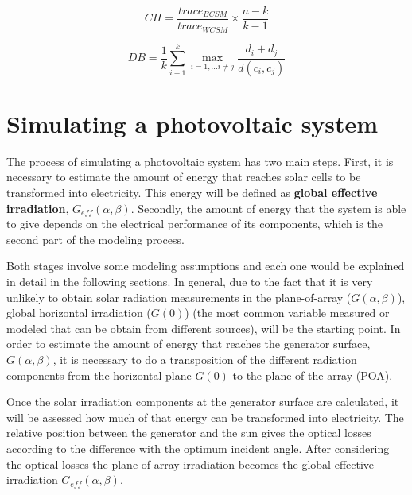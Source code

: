 \begin{equation}\label{eq:calinski}
    CH =\frac{trace_{BCSM}}{trace_{WCSM}}\times\frac{n-k}{k-1}
\end{equation}

\begin{equation}\label{eq:davies}
    DB =\frac{1}{k}\sum_{i-1}^{k}\max_{i=1,...i\neq{j}}{\frac{d_{i}+d_{j}}{d(c_i,c_j)}}
\end{equation}

\section{Simulating a photovoltaic system}

The process of simulating a photovoltaic system has two main steps. First, it is necessary to estimate the amount of energy that reaches solar cells to be transformed into electricity. This energy will be defined as \textbf{global effective irradiation}, $G_{eff}(\alpha, \beta)$. Secondly, the amount of energy that the system is able to give depends on the electrical performance of its components, which is the second part of the modeling process.

Both stages involve some modeling assumptions and each one would be explained in detail in the following sections. In general, due to the fact that it is very unlikely to obtain solar radiation measurements in the plane-of-array ($G(\alpha, \beta)$), global horizontal irradiation ($G(0)$) (the most common variable measured or modeled that can be obtain from different sources), will be the starting point. In order to estimate the amount of energy that reaches the generator surface, $G(\alpha, \beta)$, it is necessary to do a transposition of the different radiation components from the horizontal plane $G(0)$ to the plane of the array (POA).

Once the solar irradiation components at the generator surface are calculated, it will be assessed how much of that energy can be transformed into electricity. The relative position between the generator and the sun gives the optical losses according to the difference with the optimum incident angle. After considering the optical losses the plane of array irradiation becomes the global effective irradiation $G_{eff}(\alpha, \beta)$.

